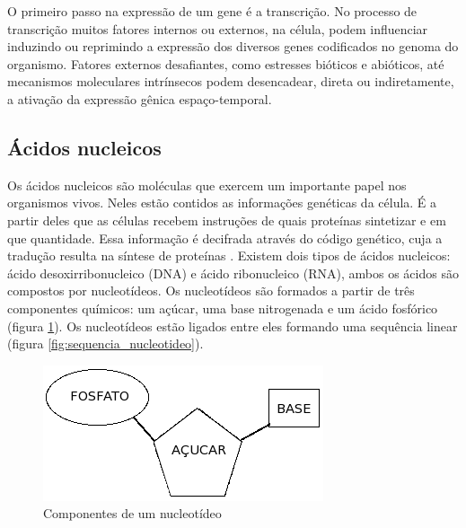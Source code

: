 O primeiro passo na expressão de um gene é a transcrição. No processo de transcrição muitos fatores internos ou externos, na célula, podem influenciar induzindo ou reprimindo a expressão dos diversos genes codificados no genoma do organismo. Fatores externos desafiantes, como estresses bióticos e abióticos, até mecanismos moleculares intrínsecos podem desencadear, direta ou indiretamente, a ativação da expressão gênica espaço-temporal.

\subsection{Ácidos nucleicos}
Os ácidos nucleicos são moléculas que exercem um importante papel nos organismos vivos. Neles estão contidos as informações genéticas da célula. É a partir deles que as células recebem instruções de quais proteínas sintetizar e em que quantidade. Essa informação é decifrada através do código genético, cuja a tradução resulta na síntese de proteínas \cite{Zaha2000}.
Existem dois tipos de ácidos nucleicos: ácido desoxirribonucleico (DNA) e ácido ribonucleico (RNA), ambos os ácidos são compostos por nucleotídeos. Os nucleotídeos são formados a partir de três componentes químicos: um açúcar, uma base nitrogenada e um ácido fosfórico (figura \ref{fig:nucleotideo}). Os nucleotídeos estão ligados entre eles formando uma sequência linear (figura \ref{fig:sequencia_nucleotideo}).

\begin{figure}[htb!]
    \centering
    \includegraphics[scale=0.7]{./imagens/componentes_nucleotideo.png}
    \caption{Componentes de um nucleotídeo}
    \label{fig:nucleotideo}
\end{figure}

